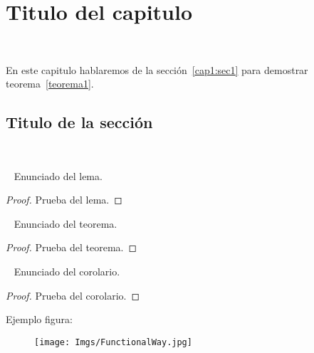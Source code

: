 \chapter{Titulo del capitulo}
~\label{cap1}

En este capitulo hablaremos de la sección~\ref{cap1:sec1} para demostrar
teorema~\ref{teorema1}.

\section{Titulo de la sección}
~\label{cap1:sec1}

\begin{lemma}~\label{lema1}
	Enunciado del lema.
\end{lemma}

\begin{proof}
	Prueba del lema.
\end{proof}

\begin{theorem}~\label{teorema1}
	Enunciado del teorema.
\end{theorem}

\begin{proof}
	Prueba del teorema.
\end{proof}

\begin{corollary}~\label{corolario1}
	Enunciado del corolario.
\end{corollary}

\begin{proof}
	Prueba del corolario.
\end{proof}

Ejemplo figura:

\begin{figure}[h]
	\centering
	\texttt{[image: Imgs/FunctionalWay.jpg]}
\end{figure}
